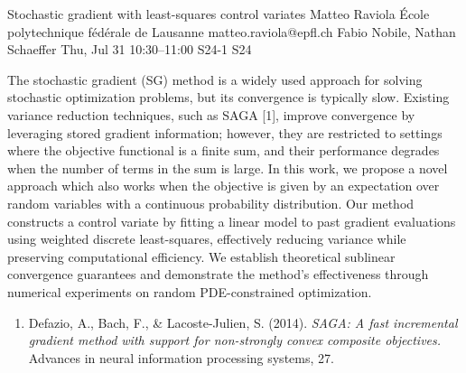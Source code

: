 \documentclass[12pt,lettersize,oneside]{book} %
\begin{document}
\begin{talk}
  {Stochastic gradient with least-squares control variates}%
  {Matteo Raviola}%
  {\'Ecole polytechnique f\'ed\'erale de Lausanne}%
  {matteo.raviola@epfl.ch}%
  {Fabio Nobile, Nathan Schaeffer}%
  {}%
  {Thu, Jul 31 10:30--11:00}%
  {S24-1}%
  {S24}%
  
  
  
  The stochastic gradient (SG) method is a widely used approach for solving stochastic optimization problems, but its convergence is typically slow.
  Existing variance reduction techniques, such as SAGA [1], improve convergence by leveraging stored gradient information; however, they are restricted to settings where the objective functional is a finite sum, and their performance degrades when the number of terms in the sum is large.
  In this work, we propose a novel approach which also works when the objective is given by an expectation over random variables with a continuous probability distribution.
  Our method constructs a control variate by fitting a linear model to past gradient evaluations using weighted discrete least-squares, effectively reducing variance while preserving computational efficiency.
  We establish theoretical sublinear convergence guarantees and demonstrate the method's effectiveness through numerical experiments on random PDE-constrained optimization.
  
  \medskip
  
  \begin{enumerate}
    \item[{[1]}] Defazio, A., Bach, F., \& Lacoste-Julien, S. (2014). {\it SAGA: A fast incremental gradient method with support for non-strongly convex composite objectives.} Advances in neural information processing systems, 27.
  \end{enumerate}
  
\end{talk}
\end{document}
